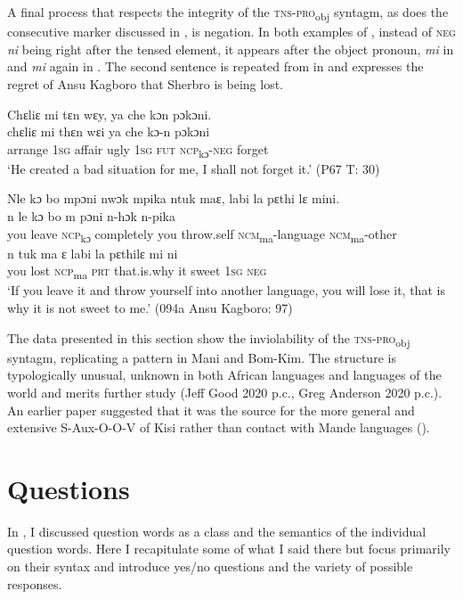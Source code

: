 A final process that respects the integrity of the \textsc{tns-pro}\textsubscript{obj} syntagm, as does the consecutive marker discussed in , is negation. In both examples of , instead of \textsc{neg} \textit{ni} being right after the tensed element, it appears after the object pronoun, \textit{mi} in  and \textit{mi} again in . The second sentence is repeated from  in  and expresses the regret of Ansu Kagboro that Sherbro is being lost.

\ea%
    \label{ex:220}
    \ea \label{ex:220a}  Chɛliɛ   mi tɛn wɛy, ya che kɔn pɔkɔni.\\
    \gll chɛliɛ    mi    thɛn  wɛi  ya    che  kɔ-n      pɔkɔni\\
    arrange  \textsc{1sg}  affair  ugly  1\textsc{sg}  \textsc{fut}  \textsc{ncp}\textsubscript{kɔ}{}-\textsc{neg}  forget\\
    \glt ‘He created a bad situation for me, I shall not forget it.' (P67 T: 30)

\newpage
    \ex \label{ex:220b} Nle kɔ bo mpɔni nwɔk mpika ntuk maɛ, labi la pɛthi lɛ mini.\\
    \gll n    le    kɔ      bo        m    pɔni      n-hɔk          n-pika\\
    you  leave  \textsc{ncp}\textsubscript{kɔ}    completely  you  throw.self  \textsc{ncm}\textsubscript{ma}{}-language  \textsc{ncm}\textsubscript{ma}{}-other\\
    \gll n    tuk  ma    ɛ      labi        la  pɛthilɛ  mi    ni\\
    you  lost  \textsc{ncp}\textsubscript{ma}    \textsc{prt}    that.is.why    it  sweet    \textsc{1sg}  \textsc{neg}\\
    \glt ‘If you leave it and throw yourself into another language, you will lose it, that is why it is not sweet to me.' (094a Ansu Kagboro: 97)
\z
\z

The data presented in this section show the inviolability of the \textsc{tns-pro}\textsubscript{obj} syntagm, replicating a pattern in Mani and Bom-Kim. The structure is typologically unusual, unknown in both African languages and languages of the world and merits further study (Jeff  {Good 2020} p.c., Greg  {Anderson 2020} p.c.). An earlier paper suggested that it was the source for the more general and extensive S-Aux-O-O-V of Kisi rather than contact with Mande languages (\citealt{Childs2017}).

\section{Questions}
\label{sec:8.3}\hypertarget{Toc115517818}{}
In , I discussed question words as a class and the semantics of the individual question words. Here I recapitulate some of what I said there but focus primarily on their syntax and introduce yes/no questions and the variety of possible responses.

